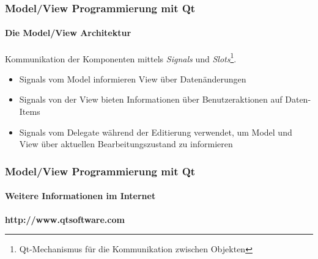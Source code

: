 \begin{frame}
	\frametitle{Model/View Programmierung mit Qt}
	\framesubtitle{Die Model/View Architektur}
	\begin{center}
		{\small Kommunikation der Komponenten mittels {\itshape Signals} und 
			{\itshape Slots}\footnote{Qt-Mechanismus für die Kommunikation zwischen Objekten}.}
	\end{center}
	\begin{itemize}
		\item Signals vom Model informieren View über Datenänderungen
		\item Signals von der View bieten Informationen über Benutzeraktionen auf Daten-Items
		\item Signals vom Delegate während der Editierung verwendet, um Model und View
		über aktuellen Bearbeitungszustand zu informieren
	\end{itemize}
\end{frame}

\begin{frame}
	\frametitle{Model/View Programmierung mit Qt}
	\framesubtitle{Weitere Informationen im Internet}
	\begin{center}
		{\Large \bf http://www.qtsoftware.com}
	\end{center}
\end{frame}

